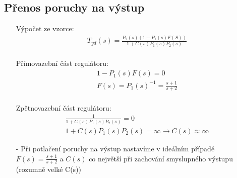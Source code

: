 \documentclass{article}
\begin{document}
\subsection{Přenos poruchy na výstup}
\begin{itemize}
    \item[] Výpočet ze vzorce:
    \begin{align*}
        T_{yd}(s) = \frac{P_2(s)(1-P_1(s)F(S))}{1+C(s)P_1(s)P_2(s)}\\
    \end{align*}
    \item[] Přímovazební část regulátoru:
    \begin{align*}
        1-P_1(s)F(s) = 0\\
        F(s) = P_1(s)^{-1} = \frac{s+1}{s+2}\\
    \end{align*}

    \item[] Zpětnovazební část regulátoru:
    \begin{align*}
        \frac{1}{1+C(s)P_1(s)P_2(s)} = 0\\
        1+C(s)P_1(s)P_2(s) = \infty \rightarrow C(s) \approx \infty
    \end{align*}

    \item[-] Při potlačení poruchy na výstup nastavíme v ideálním případě $F(s) = \frac{s+1}{s+2}$ a $C(s)$ co největší při zachování smyslupného výstupu (rozumně velké C(s))
\end{itemize}
    
\end{document}
